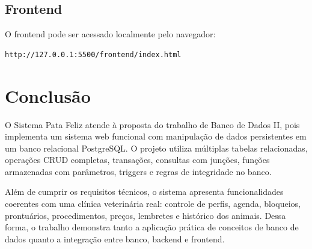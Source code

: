 \documentclass[12pt,a4paper]{article}
\begin{document}
\subsection{Frontend}

O frontend pode ser acessado localmente pelo navegador:

\begin{lstlisting}[style=codigo,caption={Endereço local do sistema}]
http://127.0.0.1:5500/frontend/index.html
\end{lstlisting}

\section{Conclusão}

O Sistema Pata Feliz atende à proposta do trabalho de Banco de Dados II, pois implementa um sistema web funcional com manipulação de dados persistentes em um banco relacional PostgreSQL. O projeto utiliza múltiplas tabelas relacionadas, operações CRUD completas, transações, consultas com junções, funções armazenadas com parâmetros, triggers e regras de integridade no banco.

Além de cumprir os requisitos técnicos, o sistema apresenta funcionalidades coerentes com uma clínica veterinária real: controle de perfis, agenda, bloqueios, prontuários, procedimentos, preços, lembretes e histórico dos animais. Dessa forma, o trabalho demonstra tanto a aplicação prática de conceitos de banco de dados quanto a integração entre banco, backend e frontend.
\end{document}
